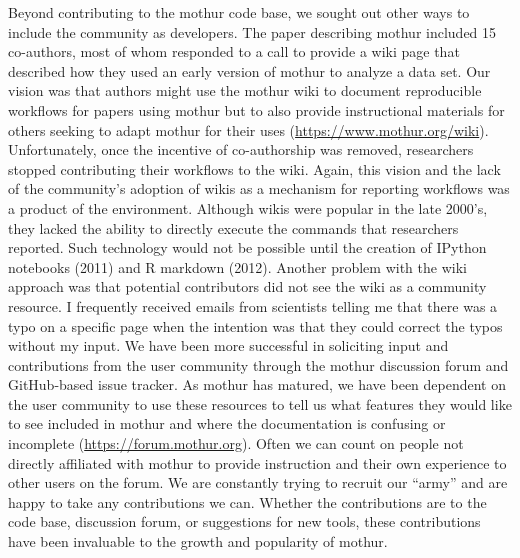 \documentclass[11pt,]{article}
\begin{document}
Beyond contributing to the mothur code base, we sought out other ways to
include the community as developers. The paper describing mothur
included 15 co-authors, most of whom responded to a call to provide a
wiki page that described how they used an early version of mothur to
analyze a data set. Our vision was that authors might use the mothur
wiki to document reproducible workflows for papers using mothur but to
also provide instructional materials for others seeking to adapt mothur
for their uses (\url{https://www.mothur.org/wiki}). Unfortunately, once
the incentive of co-authorship was removed, researchers stopped
contributing their workflows to the wiki. Again, this vision and the
lack of the community's adoption of wikis as a mechanism for reporting
workflows was a product of the environment. Although wikis were popular
in the late 2000's, they lacked the ability to directly execute the
commands that researchers reported. Such technology would not be
possible until the creation of IPython notebooks (2011) and R markdown
(2012). Another problem with the wiki approach was that potential
contributors did not see the wiki as a community resource. I frequently
received emails from scientists telling me that there was a typo on a
specific page when the intention was that they could correct the typos
without my input. We have been more successful in soliciting input and
contributions from the user community through the mothur discussion
forum and GitHub-based issue tracker. As mothur has matured, we have
been dependent on the user community to use these resources to tell us
what features they would like to see included in mothur and where the
documentation is confusing or incomplete
(\url{https://forum.mothur.org}). Often we can count on people not
directly affiliated with mothur to provide instruction and their own
experience to other users on the forum. We are constantly trying to
recruit our ``army'' and are happy to take any contributions we can.
Whether the contributions are to the code base, discussion forum, or
suggestions for new tools, these contributions have been invaluable to
the growth and popularity of mothur.
\end{document}
